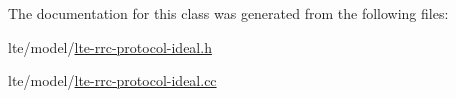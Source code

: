 The documentation for this class was generated from the following files\+:\begin{DoxyCompactItemize}
\item 
lte/model/\hyperlink{lte-rrc-protocol-ideal_8h}{lte-\/rrc-\/protocol-\/ideal.\+h}\item 
lte/model/\hyperlink{lte-rrc-protocol-ideal_8cc}{lte-\/rrc-\/protocol-\/ideal.\+cc}\end{DoxyCompactItemize}
